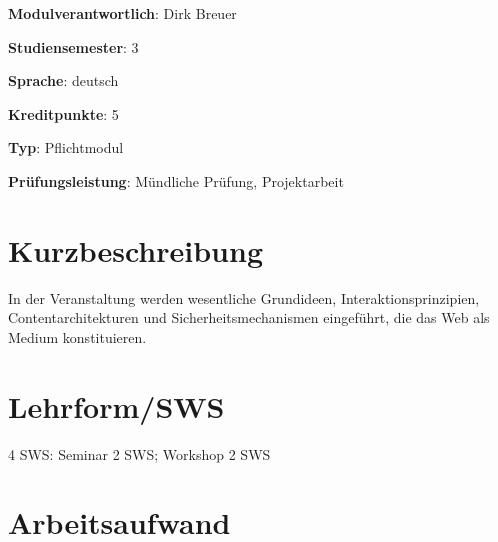 \begin{modulHead}
\textbf{Modulverantwortlich}: Dirk
Breuer
\end{modulHead}
\begin{modulHead}
\textbf{Studiensemester}:
3
\end{modulHead}
\begin{modulHead}
\textbf{Sprache}:
deutsch
\end{modulHead}
\begin{modulHead}
\textbf{Kreditpunkte}:
5
\end{modulHead}
\begin{modulHead}
\textbf{Typ}:
Pflichtmodul
\end{modulHead}
\begin{modulHead}
\textbf{Prüfungsleistung}:
Mündliche Prüfung, Projektarbeit
\end{modulHead}


\hypertarget{kurzbeschreibungpathlabelmi-2017modulbeschreibungen-bachelorba_grundlagen-des-web}{%
\section*{Kurzbeschreibung\label{/mi-2017/modulbeschreibungen-bachelor/BA_Grundlagen-des-web}}\label{kurzbeschreibungpathlabelmi-2017modulbeschreibungen-bachelorba_grundlagen-des-web}}

In der Veranstaltung werden wesentliche Grundideen,
Interaktionsprinzipien, Contentarchitekturen und Sicherheitsmechanismen
eingeführt, die das Web als Medium konstituieren.

\hypertarget{lehrformswspathlabelmi-2017modulbeschreibungen-bachelorba_grundlagen-des-web}{%
\section*{Lehrform/SWS\label{/mi-2017/modulbeschreibungen-bachelor/BA_Grundlagen-des-web}}\label{lehrformswspathlabelmi-2017modulbeschreibungen-bachelorba_grundlagen-des-web}}

4 SWS: Seminar 2 SWS; Workshop 2 SWS

\hypertarget{arbeitsaufwandpathlabelmi-2017modulbeschreibungen-bachelorba_grundlagen-des-web}{%
\section*{Arbeitsaufwand\label{/mi-2017/modulbeschreibungen-bachelor/BA_Grundlagen-des-web}}\label{arbeitsaufwandpathlabelmi-2017modulbeschreibungen-bachelorba_grundlagen-des-web}}

